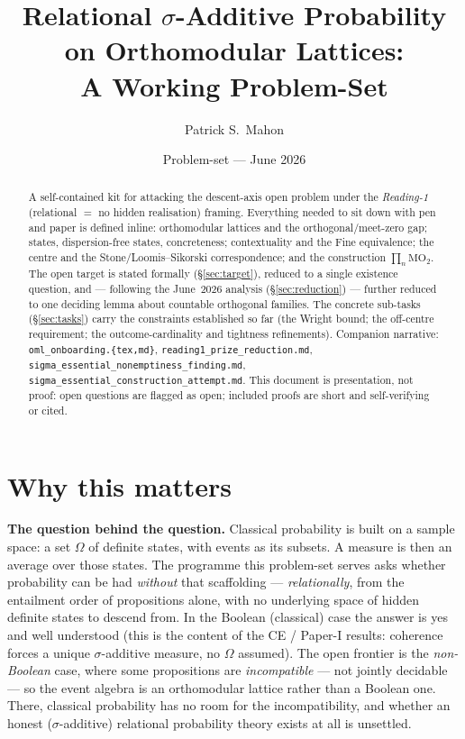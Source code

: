 \documentclass[11pt]{article}
\title{Relational $\sigma$-Additive Probability on Orthomodular Lattices:\\
A Working Problem-Set}
\author{Patrick S.\ Mahon}
\date{Problem-set --- June 2026}
\theoremstyle{definition}
\theoremstyle{remark}
\newcommand{\MOO}{\mathrm{MO}_2}
\begin{document}
\maketitle

\begin{abstract}
\noindent A self-contained kit for attacking the descent-axis open problem under
the \emph{Reading-1} (relational $=$ no hidden realisation) framing. Everything
needed to sit down with pen and paper is defined inline: orthomodular lattices and
the orthogonal/meet-zero gap; states, dispersion-free states, concreteness;
contextuality and the Fine equivalence; the centre and the Stone/Loomis--Sikorski
correspondence; and the construction $\prod_n\MOO$. The open target is stated
formally (\S\ref{sec:target}), reduced to a single existence question, and ---
following the June~2026 analysis (\S\ref{sec:reduction}) --- further reduced to one
deciding lemma about countable orthogonal families. The concrete sub-tasks
(\S\ref{sec:tasks}) carry the constraints established so far (the Wright bound; the
off-centre requirement; the outcome-cardinality and tightness refinements).
Companion narrative: \texttt{oml\_onboarding.\{tex,md\}},
\texttt{reading1\_prize\_reduction.md}, \texttt{sigma\_essential\_nonemptiness\_finding.md},
\texttt{sigma\_essential\_construction\_attempt.md}.
This document is presentation, not proof: open questions are flagged as open;
included proofs are short and self-verifying or cited.
\end{abstract}

\tableofcontents

\section*{Why this matters}

\noindent\textbf{The question behind the question.} Classical probability is built
on a sample space: a set $\Omega$ of definite states, with events as its subsets.
A measure is then an average over those states. The programme this problem-set
serves asks whether probability can be had \emph{without} that scaffolding ---
\emph{relationally}, from the entailment order of propositions alone, with no
underlying space of hidden definite states to descend from. In the Boolean
(classical) case the answer is yes and well understood (this is the content of the
CE / Paper-I results: coherence forces a unique $\sigma$-additive measure, no
$\Omega$ assumed). The open frontier is the \emph{non-Boolean} case, where some
propositions are \emph{incompatible} --- not jointly decidable --- so the event
algebra is an orthomodular lattice rather than a Boolean one. There, classical
probability has no room for the incompatibility, and whether an honest
($\sigma$-additive) relational probability theory exists at all is unsettled.
\end{document}
